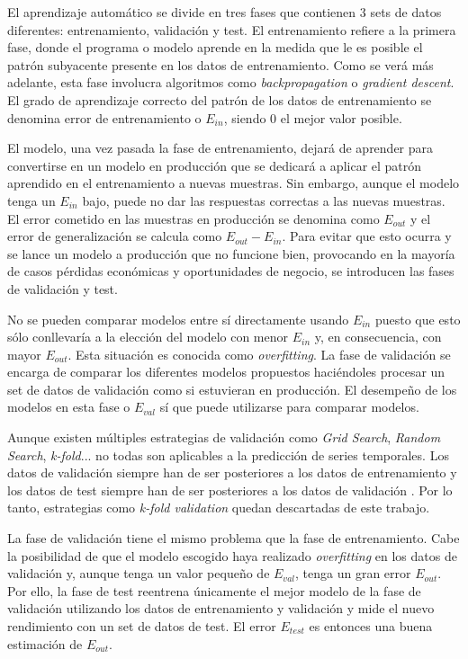 El aprendizaje automático se divide en tres fases que contienen 3 sets de datos diferentes: entrenamiento, validación y test. El entrenamiento refiere a la primera fase, donde el programa o modelo aprende en la medida que le es posible el patrón subyacente presente en los datos de entrenamiento. Como se verá más adelante, esta fase involucra algoritmos como \textit{backpropagation} o \textit{gradient descent}. El grado de aprendizaje correcto del patrón de los datos de entrenamiento se denomina error de entrenamiento o $E_{in}$, siendo 0 el mejor valor posible.

El modelo, una vez pasada la fase de entrenamiento, dejará de aprender para convertirse en un modelo en producción que se dedicará a aplicar el patrón aprendido en el entrenamiento a nuevas muestras. Sin embargo, aunque el modelo tenga un $E_{in}$ bajo, puede no dar las respuestas correctas a las nuevas muestras. El error cometido en las muestras en producción se denomina como $E_{out}$ y el error de generalización se calcula como $E_{out}-E_{in}$. Para evitar que esto ocurra y se lance un modelo a producción que no funcione bien, provocando en la mayoría de casos pérdidas económicas y oportunidades de negocio, se introducen las fases de validación y test.

No se pueden comparar modelos entre sí directamente usando $E_{in}$ puesto que esto sólo conllevaría a la elección del modelo con menor $E_{in}$ y, en consecuencia, con mayor $E_{out}$. Esta situación es conocida como \textit{overfitting}. La fase de validación se encarga de comparar los diferentes modelos propuestos haciéndoles procesar un set de datos de validación como si estuvieran en producción. El desempeño de los modelos en esta fase o $E_{val}$ sí que puede utilizarse para comparar modelos.

Aunque existen múltiples estrategias de validación como \textit{Grid Search}, \textit{Random Search}, \textit{k-fold}... no todas son aplicables a la predicción de series temporales. Los datos de validación siempre han de ser posteriores a los datos de entrenamiento y los datos de test siempre han de ser posteriores a los datos de validación \cite{machinelearningbook1}. Por lo tanto, estrategias como \textit{k-fold validation} quedan descartadas de este trabajo.

La fase de validación tiene el mismo problema que la fase de entrenamiento. Cabe la posibilidad de que el modelo escogido haya realizado \textit{overfitting} en los datos de validación y, aunque tenga un valor pequeño de $E_{val}$, tenga un gran error $E_{out}$. Por ello, la fase de test reentrena únicamente el mejor modelo de la fase de validación utilizando los datos de entrenamiento y validación y mide el nuevo rendimiento con un set de datos de test. El error $E_{test}$ es entonces una buena estimación de $E_{out}$.

